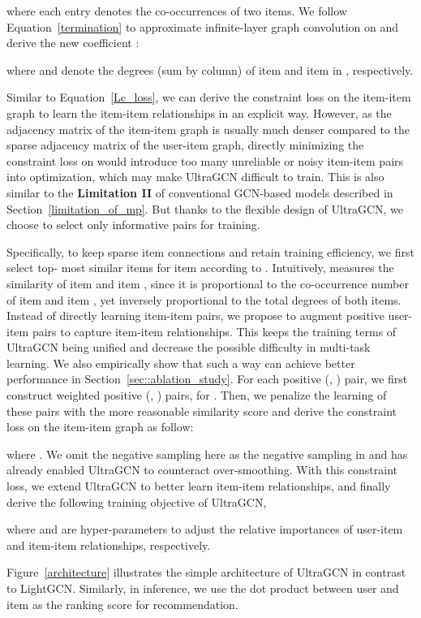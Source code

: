 \documentclass[sigconf,authorversion]{acmart}
\begin{document}
where each entry denotes the co-occurrences of two items. We follow Equation~\ref{termination} to approximate infinite-layer graph convolution on  and derive the new coefficient :

where  and  denote the degrees (sum by column) of item  and item  in , respectively.

Similar to Equation~\ref{Lc_loss}, we can derive the constraint loss on the item-item graph to learn the item-item relationships in an explicit way.
However, as the adjacency matrix  of the item-item graph is usually much denser compared to the sparse adjacency matrix  of the user-item graph, directly minimizing the constraint loss on  would introduce too many unreliable or noisy item-item pairs into optimization, which may make UltraGCN difficult to train. This is also similar to the \textbf{Limitation II} of conventional GCN-based models described in Section~\ref{limitation_of_mp}. But thanks to the flexible design of UltraGCN, we choose to select only informative pairs for training.  

Specifically, to keep sparse item connections and retain training efficiency, we first select top- most similar items  for item  according to .
Intuitively,  measures the similarity of item  and item , since it is proportional to the co-occurrence number of item  and item , yet inversely proportional to the total degrees of both items. Instead of directly learning item-item pairs, we propose to augment positive user-item pairs to capture item-item relationships. This keeps the training terms of UltraGCN being unified and decrease the possible difficulty in multi-task learning. We also empirically show that such a way can achieve better performance in Section~\ref{sec::ablation_study}.   
For each positive (, ) pair, we first  construct  weighted positive (, ) pairs, for . Then, we penalize the learning of these pairs with the more reasonable similarity score  and derive the constraint loss  on the item-item graph as follow:
 
where . 
We omit the negative sampling here as the negative sampling in  and  has already enabled UltraGCN to counteract over-smoothing. 
With this constraint loss, we extend UltraGCN to better learn item-item relationships, and finally derive the following training objective of UltraGCN,

where  and  are hyper-parameters to adjust the relative importances of user-item and item-item relationships, respectively.

Figure~\ref{architecture} illustrates the simple architecture of UltraGCN in contrast to LightGCN. Similarly, in inference, we use the dot product  between user  and item  as the ranking score for recommendation.
\end{document}
